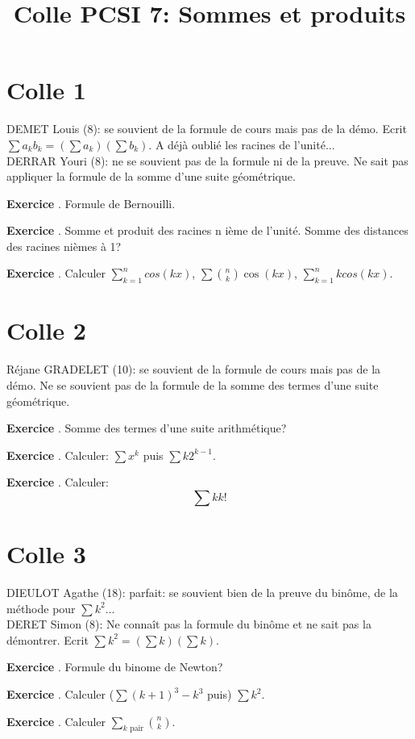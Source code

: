 \documentclass[10pt,a4paper]{article}
\title{Colle PCSI 7: Sommes et produits}
\newcounter{question}
\newcounter{exo}
\newenvironment{exo}{\vspace{0.5cm}\setcounter{question}{0}\addtocounter{exo}{1} \noindent \textbf{Exercice \theexo}. \normalsize }{\par}
\begin{document}
	\maketitle

	\section*{Colle 1}
	DEMET Louis (8): se souvient de la formule de cours mais pas de la démo. Ecrit $\sum a_k b_k = (\sum a_k) (\sum b_k)$. A déjà oublié les racines de l'unité... \\
	DERRAR Youri (8): ne se souvient pas de la formule ni de la preuve. Ne sait pas appliquer la formule de la somme d'une suite géométrique.
	
	\begin{exo}
		Formule de Bernouilli.
	\end{exo}
	
	\begin{exo}
		Somme et produit des racines n ième de l'unité. Somme des distances des racines nièmes à 1?
	\end{exo}

	\begin{exo}
		Calculer $\sum_{k=1}^{n} cos(k x)$, $\sum \binom{n}{k} \cos(kx)$, $\sum_{k=1}^{n} k cos(k x)$.
	\end{exo}	
	
	\section*{Colle 2}
	\setcounter{exo}{0}
	Réjane GRADELET (10): se souvient de la formule de cours mais pas de la démo. Ne se souvient pas de la formule de la somme des termes d'une suite géométrique.\\
	
	
	\begin{exo}
		Somme des termes d'une suite arithmétique?
	\end{exo}
	
	\begin{exo}
		Calculer: $\sum x^{k}$ puis $\sum k 2^{k-1}$. 
	\end{exo}

	\begin{exo}
		Calculer: 
		$$\sum k k!$$ 
	\end{exo}	
	\section*{Colle 3}
	\setcounter{exo}{0}
	DIEULOT Agathe (18): parfait: se souvient bien de la preuve du binôme, de la méthode pour $\sum k^2$...\\
	DERET Simon (8): Ne connaît pas la formule du binôme et ne sait pas la démontrer. Ecrit $\sum k^2 = (\sum k)(\sum k)$.
	
	\begin{exo}
		Formule du binome de Newton?
	\end{exo}
	\begin{exo}
		Calculer ($\sum (k+1)^3 - k^3$ puis) $\sum k^2$.
	\end{exo}
	
	\begin{exo}
		Calculer $\sum_{k\text{ pair}} \binom{n}{k}$.
	\end{exo}
\end{document}
